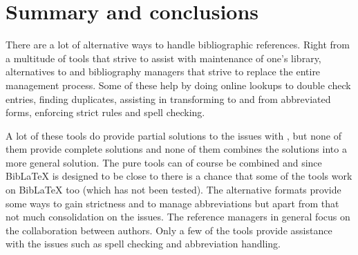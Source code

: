 







\section{Summary and conclusions}
There are a lot of alternative ways to handle
bibliographic references.  Right from a multitude of tools that strive
to assist with maintenance of one's {\bibtex} library, alternatives to
{\bibtex} and bibliography managers that strive to replace the entire
management process.  Some of these help by doing online lookups to
double check entries, finding duplicates, assisting in transforming to
and from abbreviated forms, enforcing strict rules and spell checking.

A lot of these tools do provide partial solutions to the issues with
{\bibtex}, but none of them provide complete solutions and none of
them combines the solutions into a more general solution.  The pure
{\bibtex} tools can of course be combined and since Bib{\LaTeX} is
designed to be close to {\bibtex} there is a chance that some of the
{\bibtex} tools work on Bib{\LaTeX} too (which has not been tested).
The alternative formats provide some ways to gain strictness and to
manage abbreviations but apart from that not much consolidation on the
issues.  The reference managers in general focus on the collaboration
between authors.  Only a few of the tools provide assistance with the
issues such as spell checking and abbreviation handling.


